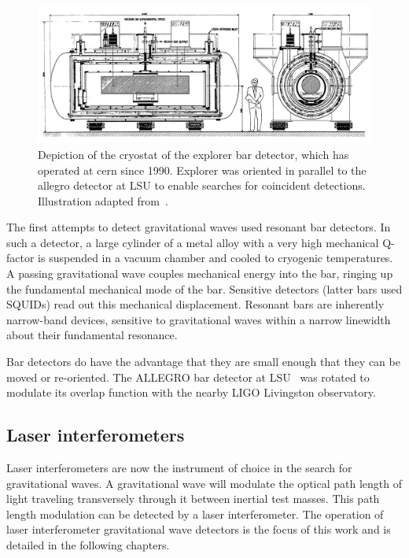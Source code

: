 \begin{figure}
\includegraphics[width=\columnwidth]{chapter1/figures/explorer.png}
\caption[EXPLORER bar detector]{\label{fig:explorer-bar}Depiction of
  the cryostat of the {\sc explorer} bar detector, which has operated
  at {\sc cern} since 1990.  {\sc Explorer} was oriented in parallel
  to the {\sc allegro} detector at LSU\cite{Mauceli1996Allegro} to
  enable searches for coincident detections.  Illustration adapted
  from~\cite{Astone1993Longterm}.}
\end{figure}

The first attempts to detect gravitational waves used resonant bar
detectors.  In such a detector, a large cylinder of a metal alloy with
a very high mechanical Q-factor is suspended in a vacuum chamber and
cooled to cryogenic temperatures.  A passing gravitational wave
couples mechanical energy into the bar, ringing up the fundamental
mechanical mode of the bar.  Sensitive detectors (latter bars used
SQUIDs) read out this mechanical displacement.  Resonant bars are
inherently narrow-band devices, sensitive to gravitational waves
within a narrow linewidth about their fundamental resonance.

Bar detectors do have the advantage that they are small enough that
they can be moved or re-oriented.  The ALLEGRO bar detector at LSU~\cite{Mauceli1996Allegro} was
rotated to modulate its overlap function with the nearby LIGO
Livingston observatory.%

\subsection{Laser interferometers}

Laser interferometers are now the instrument of choice in the search
for gravitational waves.  A gravitational wave will modulate the
optical path length of light traveling transversely through it between
inertial test masses.  This path length modulation can be detected by
a laser interferometer.  The operation of laser interferometer
gravitational wave detectors is the focus of this work and is detailed
in the following chapters.

